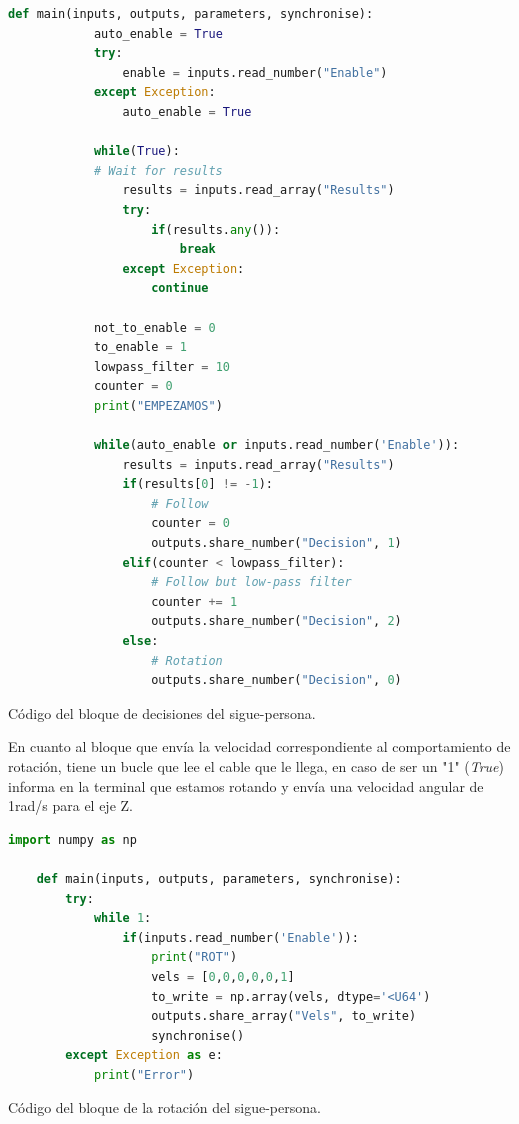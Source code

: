 \begin{code}[H]
    \begin{lstlisting}[language=python]
        def main(inputs, outputs, parameters, synchronise):
            auto_enable = True
            try:
                enable = inputs.read_number("Enable")
            except Exception:
                auto_enable = True
             
            while(True):
            # Wait for results
                results = inputs.read_array("Results")
                try:
                    if(results.any()):
                        break
                except Exception:
                    continue
    
            not_to_enable = 0
            to_enable = 1
            lowpass_filter = 10
            counter = 0
            print("EMPEZAMOS")

            while(auto_enable or inputs.read_number('Enable')):
                results = inputs.read_array("Results")
                if(results[0] != -1):
                    # Follow
                    counter = 0
                    outputs.share_number("Decision", 1)
                elif(counter < lowpass_filter):
                    # Follow but low-pass filter
                    counter += 1
                    outputs.share_number("Decision", 2)
                else:
                    # Rotation
                    outputs.share_number("Decision", 0)
    \end{lstlisting}
    \caption[Código bloque decisión sigue-persona]{Código del bloque de decisiones del sigue-persona.}
    \label{cod:decision_follow_person}
\end{code}

En cuanto al bloque que envía la velocidad correspondiente al comportamiento de rotación, tiene un bucle que lee el cable que le llega, en caso de
ser un "1" (\textit{True}) informa en la terminal que estamos rotando y envía una velocidad angular de 1rad/s para el eje Z.

\begin{code}[H]
    \begin{lstlisting}[language=python]
    import numpy as np

    def main(inputs, outputs, parameters, synchronise):
        try:
            while 1:
                if(inputs.read_number('Enable')):
                    print("ROT")
                    vels = [0,0,0,0,0,1]
                    to_write = np.array(vels, dtype='<U64')
                    outputs.share_array("Vels", to_write)   
                    synchronise()
        except Exception as e:
            print("Error")
    \end{lstlisting}
    \caption[Código bloque rotación sigue-persona]{Código del bloque de la rotación del sigue-persona.}
    \label{cod:rotation_follow_person}
\end{code}

